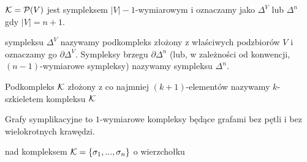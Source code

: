 \begin{example}
  \item $\mathcal{K}=\mathcal{P}(V)$ jest sympleksem $|V|-1$-wymiarowym i oznaczamy jako $\Delta^V$ lub $\Delta^n$ gdy $|V|=n+1$.
  \item {} sympleksu $\Delta^V$ nazywamy podkompleks złożony z właściwych podzbiorów $V$ i oznaczamy go $\partial\Delta^V$. Sympleksy brzegu $\partial\Delta^n$ (lub, w zależności od konwencji, $(n-1)$-wymiarowe sympleksy) nazywamy  sympleksu $\Delta^n$.
  \item Podkompleks $\mathcal{K}$ złożony z co najmniej $(k+1)$-elementów nazywamy $k$-szkieletem kompleksu $\mathcal{K}$
  \item Grafy symplikacyjne to $1$-wymiarowe kompleksy będące grafami bez pętli i bez wielokrotnych krawędzi.
  \item {} nad kompleksem $\mathcal{K}=\{\sigma_1,...,\sigma_n\}$ o wierzchołku
\end{example}

